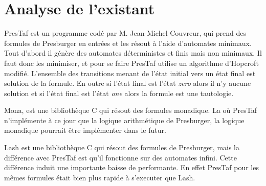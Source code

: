 \section{Analyse de l'existant}

PresTaf est un programme codé par M. Jean-Michel Couvreur, qui prend des formules de Presburger en entrées et les résout à l'aide d'automates minimaux. Tout d'abord il génère des automates déterministes et finis mais non minimaux. Il faut donc les minimiser, et pour se faire PresTaf utilise un algorithme d'Hopcroft modifié. L'ensemble des transitions menant de l'état initial vers un état final est solution de la formule. En outre si l'état final est l'état \emph{zero} alors il n'y aucune solution et si l'état final est l'état \emph{one} alors la formule est une tautologie.\\\par

Mona, est une bibliothèque C qui résout des formules monadique. La où PresTaf n'implémente à ce jour que la logique arithmétique de Presburger, la logique monadique pourrait être implémenter dans le futur.\\\par

Lash\cite{lash} est une bibliothèque C qui résout des formules de Presburger, mais la différence avec PresTaf est qu'il fonctionne sur des automates infini. Cette différence induit une importante baisse de performante. En effet PresTaf pour les mêmes formules était bien plus rapide à s'executer que Lash\cite{DBLP:conf/wia/Couvreur04}.\\\par
